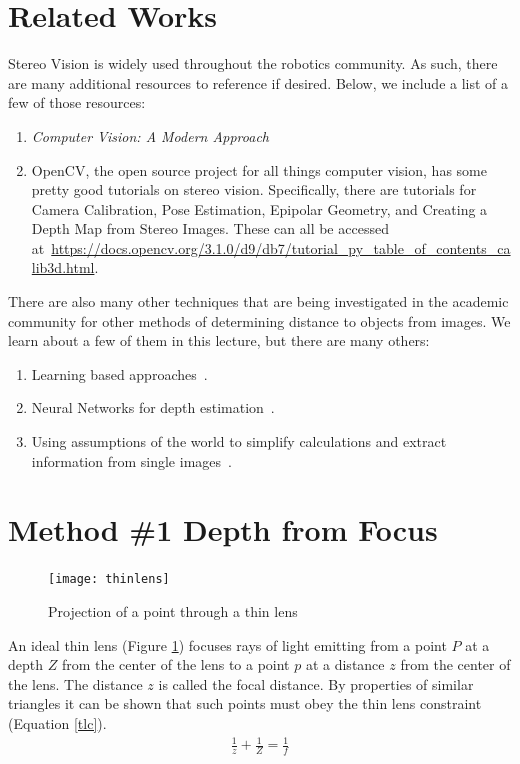 \documentclass[twoside]{article}
\begin{document}
\section{Related Works}
Stereo Vision is widely used throughout the robotics community. As such, there are many additional resources to reference if desired.
Below, we include a list of a few of those resources:
\begin{enumerate}
	\item \textit{Computer Vision: A Modern Approach}~\cite{FP}
	\item OpenCV, the open source project for all things computer vision, has some pretty good tutorials on stereo vision. 
	Specifically, there are tutorials for Camera Calibration, Pose Estimation, Epipolar Geometry, and Creating a Depth Map from Stereo Images. 
	These can all be accessed at~\url{https://docs.opencv.org/3.1.0/d9/db7/tutorial_py_table_of_contents_calib3d.html}.
\end{enumerate}
There are also many other techniques that are being investigated in the academic community for other methods of determining distance to objects from images. We learn about a few of them in this lecture, but there are many others:
\begin{enumerate}
	\item Learning based approaches~\cite{Saxena_depth_est}.
	\item Neural Networks for depth estimation~\cite{nips_depth,single_image_depth,Schennings1167554}.
	\item Using assumptions of the world to simplify calculations and extract information from single images~\cite{effecient_exact,inside_box}.
\end{enumerate}

\section{Method \#1 Depth from Focus}

\begin{figure}[h!]
  \begin{center}
    \texttt{[image: thinlens]}
  \end{center}
  \caption{Projection of a point through a thin lens}
  \label{lens}
\end{figure}

An ideal thin lens (Figure \ref{lens}) focuses rays of light emitting from a point $P$ at a depth $Z$ from the center of the lens to a point $p$ at a distance $z$ from the center of the lens. The distance $z$ is called the focal distance. By properties of similar triangles it can be shown that such points must obey the thin lens constraint (Equation \ref{tlc}).
\begin{align}
  \label{tlc}
  \frac{1}{z} + \frac{1}{Z} = \frac{1}{f}
\end{align}
\end{document}
